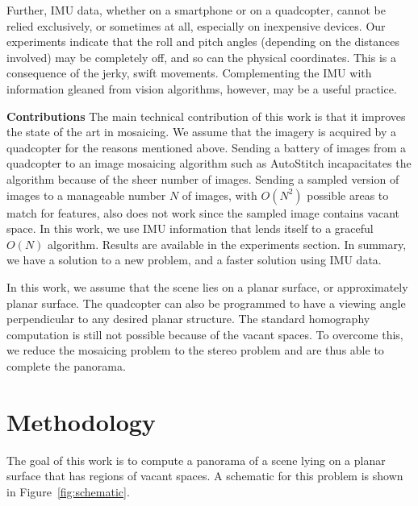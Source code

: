 Further, IMU data, whether on a smartphone or on a quadcopter, cannot
be relied exclusively, or sometimes at all, especially on inexpensive
devices. Our experiments indicate that the roll and pitch angles
(depending on the distances involved) may be completely off, and so
can the physical coordinates.  This is a consequence of the jerky,
swift movements.  Complementing the IMU with information gleaned from
vision algorithms, however, may be a useful practice.

{\bf Contributions} The main technical contribution of this work is
that it improves the state of the art in mosaicing.  We assume that
the imagery is acquired by a quadcopter for the reasons mentioned
above. Sending a battery of images from a quadcopter to an image
mosaicing algorithm such as AutoStitch incapacitates the algorithm
because of the sheer number of images. Sending a sampled version of
images to a manageable number $N$ of images, with $O(N^2)$ possible
areas to match for features, also does not work since the sampled
image contains vacant space.  In this work, we use IMU information
that lends itself to a graceful $O(N)$ algorithm.  Results are
available in the experiments section. In summary, we have a solution to a new problem, and a
faster solution using IMU data.

In this work, we assume that the scene lies on a planar surface, or
approximately planar surface. The quadcopter can also be programmed to
have a viewing angle perpendicular to any desired planar structure.
The standard homography computation is still not possible because of
the vacant spaces. To overcome this, we reduce the mosaicing problem
to the stereo problem and are thus able to complete the panorama.


\section{Methodology}

The goal of this work is to compute a panorama of a scene lying on
a planar surface that has regions of vacant spaces.  A schematic for
this problem is shown in Figure~\ref{fig:schematic}. 

